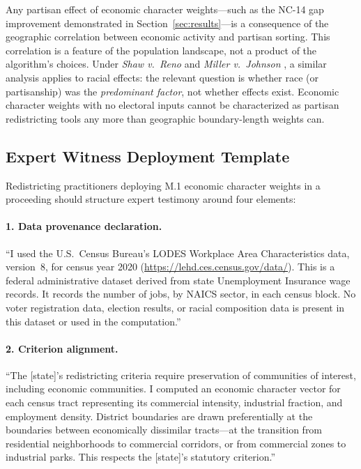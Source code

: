 Any partisan effect of economic character weights---such as the NC-14 gap
improvement demonstrated in Section~\ref{sec:results}---is a consequence of
the geographic correlation between economic activity and partisan sorting.
This correlation is a feature of the population landscape, not a product of
the algorithm's choices.
Under \textit{Shaw v.\ Reno} \citeyearpar{shaw1993} and \textit{Miller v.\
Johnson} \citeyearpar{miller1995}, a similar analysis applies to racial effects:
the relevant question is whether race (or partisanship) was the \emph{predominant
factor}, not whether effects exist.
Economic character weights with no electoral inputs cannot be characterized
as partisan redistricting tools any more than geographic boundary-length
weights can.

\subsection{Expert Witness Deployment Template}

Redistricting practitioners deploying M.1 economic character weights in a
proceeding should structure expert testimony around four elements:

\paragraph{1. Data provenance declaration.}
``I used the U.S.\ Census Bureau's LODES Workplace Area Characteristics data,
version~8, for census year 2020 (\url{https://lehd.ces.census.gov/data/}).
This is a federal administrative dataset derived from state Unemployment
Insurance wage records.
It records the number of jobs, by NAICS sector, in each census block.
No voter registration data, election results, or racial composition data
is present in this dataset or used in the computation.''

\paragraph{2. Criterion alignment.}
``The [state]'s redistricting criteria require preservation of communities
of interest, including economic communities.
I computed an economic character vector for each census tract representing
its commercial intensity, industrial fraction, and employment density.
District boundaries are drawn preferentially at the boundaries between
economically dissimilar tracts---at the transition from residential
neighborhoods to commercial corridors, or from commercial zones to
industrial parks.
This respects the [state]'s statutory criterion.''

